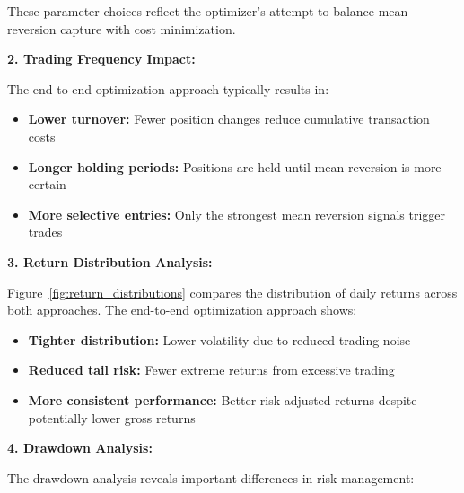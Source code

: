 These parameter choices reflect the optimizer's attempt to balance mean reversion capture with cost minimization.

\textbf{2. Trading Frequency Impact:}

The end-to-end optimization approach typically results in:
\begin{itemize}
    \item \textbf{Lower turnover:} Fewer position changes reduce cumulative transaction costs
    \item \textbf{Longer holding periods:} Positions are held until mean reversion is more certain
    \item \textbf{More selective entries:} Only the strongest mean reversion signals trigger trades
\end{itemize}


\textbf{3. Return Distribution Analysis:}

Figure~\ref{fig:return_distributions} compares the distribution of daily returns across both approaches. The end-to-end optimization approach shows:
\begin{itemize}
    \item \textbf{Tighter distribution:} Lower volatility due to reduced trading noise
    \item \textbf{Reduced tail risk:} Fewer extreme returns from excessive trading
    \item \textbf{More consistent performance:} Better risk-adjusted returns despite potentially lower gross returns
\end{itemize}


\textbf{4. Drawdown Analysis:}

The drawdown analysis reveals important differences in risk management:


